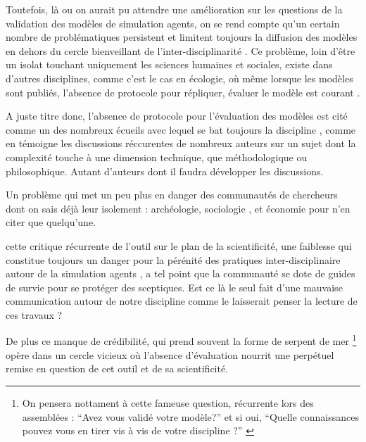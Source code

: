 Toutefois, là ou on aurait pu attendre une amélioration sur les questions de la validation des modèles de simulation agents, on se rend compte qu'un certain nombre de problématiques persistent et limitent toujours la diffusion des modèles en dehors du cercle bienveillant de l'inter-disciplinarité \autocite{Richiardi2006}. Ce problème, loin d'être un isolat touchant uniquement les sciences humaines et sociales, existe dans d'autres disciplines, comme c'est le cas en écologie, où même lorsque les modèles sont publiés, l'absence de protocole pour répliquer, évaluer le modèle est courant \autocite{Grimm1999}.

A juste titre donc, l'absence de protocole pour l'évaluation des modèles est cité comme un des nombreux écueils avec lequel se bat toujours la discipline \autocite{Heath2009}, comme en témoigne les discussions réccurentes de nombreux auteurs sur un sujet dont la complexité touche à une dimension technique, que méthodologique ou philosophique. Autant d'auteurs \autocite{Richiardi2006} \autocite{Fagiolo2007} \autocite{Moss2008} \autocite{Windrum2007} \autocite{Barlas1996} \autocite{Amblard2003} \autocite{OSullivan2004} \autocite{Doran2000} \autocite{Crooks2012} \autocite{Rouchier2013} dont il faudra développer les discussions.  

Un problème qui met un peu plus en danger des communautés de chercheurs dont on sais déjà leur isolement : archéologie, sociologie \autocite{Manzo2007}, et économie \autocite{Lehtinen2007} \autocite{Richiardi2006} pour n'en citer que quelqu'une. 

cette critique récurrente de l'outil sur le plan de la scientificité, une faiblesse qui constitue toujours un danger pour la pérénité des pratiques inter-disciplinaire autour de la simulation agents \autocite[220]{Squazzoni2010}, a tel point que la communauté se dote de guides de survie pour se protéger des sceptiques. \autocite{Waldherr2013} Est ce là le seul fait d'une mauvaise communication autour de notre discipline comme le laisserait penser la lecture de ces travaux ? 

De plus ce manque de crédibilité, qui prend souvent la forme de serpent de mer \footnote{ On pensera nottament à cette fameuse question, récurrente lors des assemblées : \enquote{Avez vous validé votre modèle?} et si oui, \enquote{Quelle connaissances pouvez vous en tirer vis à vis de votre discipline ?} \autocite{Amblard2006} } opère dans un cercle vicieux où l'absence d'évaluation nourrit une perpétuel remise en question de cet outil et de sa scientificité. %

